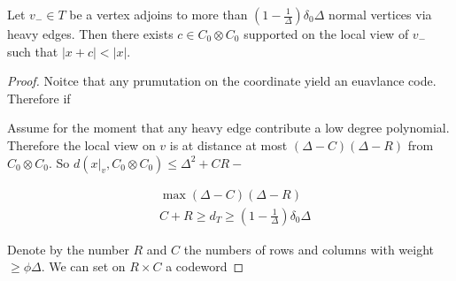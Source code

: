 \begin{claim}
  Let $v_{-} \in T$ be a vertex adjoins to more than $\left( 1 - \frac{1}{\Delta} \right)\delta_{0}\Delta$ normal vertices via heavy edges. Then there exists $c \in C_{0} \otimes C_{0}$ supported on the local view of $v_{-}$ such that $|x + c| < |x|$. 
\end{claim}

\begin{proof}
  Noitce that any prumutation on the coordinate yield an euavlance code. Therefore if      

  \begin{center}
\end{center}


Assume for the moment that any heavy edge contribute a low degree polynomial. Therefore the local view on $v$ is at distance at most $ \left( \Delta - C \right)\left( \Delta - R \right) $ from $C_{0}\otimes C_{0}$. So $d(x|_{v}, C_{0}\otimes C_{0}) \le \Delta^{2}+CR -   $ 


\begin{equation*}
  \begin{split}
    & \max \left( \Delta - C \right)\left( \Delta - R  \right) \\ 
    & C + R \ge d_{T} \ge \left( 1 - \frac{1}{\Delta} \right)\delta_{0}\Delta
  \end{split}
\end{equation*}

Denote by the number $R $ and $C$ the numbers of rows and columns with weight $\ge \phi \Delta$. We can set on $R\times C$ a codeword  
                        
                        
\end{proof}             

